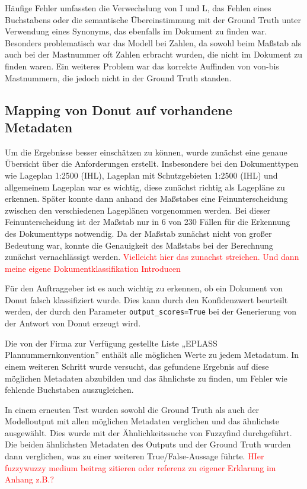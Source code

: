 \documentclass[12pt,a4paper,twoside]{article}
\newcommand\myworries[1]{\textcolor{red}{#1}}
\begin{document}
Häufige Fehler umfassten die Verwechslung von I und L, das Fehlen eines Buchstabens oder die semantische Übereinstimmung mit der Ground Truth unter Verwendung eines Synonyms, das ebenfalls im Dokument zu finden war. Besonders problematisch war das Modell bei Zahlen, da sowohl beim Maßstab als auch bei der Mastnummer oft Zahlen erbracht wurden, die nicht im Dokument zu finden waren. Ein weiteres Problem war das korrekte Auffinden von von-bis Mastnummern, die jedoch nicht in der Ground Truth standen.

\subsection{Mapping von Donut auf vorhandene Metadaten}

Um die Ergebnisse besser einschätzen zu können, wurde zunächst eine genaue Übersicht über die Anforderungen erstellt. Insbesondere bei den Dokumenttypen wie Lageplan 1:2500 (IHL), Lageplan mit Schutzgebieten 1:2500 (IHL) und allgemeinem Lageplan war es wichtig, diese zunächst richtig als Lagepläne zu erkennen. Später konnte dann anhand des Maßstabes eine Feinunterscheidung zwischen den verschiedenen Lageplänen vorgenommen werden. Bei dieser Feinunterscheidung ist der Maßstab nur in 6 von 230 Fällen für die Erkennung des Dokumenttyps notwendig. Da der Maßstab zunächst nicht von großer Bedeutung war, konnte die Genauigkeit des Maßstabs bei der Berechnung zunächst vernachlässigt werden. 
\myworries{Vielleicht hier das zunachst streichen. Und dann meine eigene Dokumentklassifikation Introducen}

Für den Auftraggeber ist es auch wichtig zu erkennen, ob ein Dokument von Donut falsch klassifiziert wurde. Dies kann durch den Konfidenzwert beurteilt werden, der durch den Parameter \texttt{output\_scores=True} bei der Generierung von der Antwort von Donut erzeugt wird.

Die von der Firma zur Verfügung gestellte Liste „EPLASS Plannummernkonvention” enthält alle möglichen Werte zu jedem Metadatum. In einem weiteren Schritt wurde versucht, das gefundene Ergebnis auf diese möglichen Metadaten abzubilden und das ähnlichste zu finden, um Fehler wie fehlende Buchstaben auszugleichen.

In einem erneuten Test wurden sowohl die Ground Truth als auch der Modelloutput mit allen möglichen Metadaten verglichen und das ähnlichste ausgewählt. Dies wurde mit der Ähnlichkeitssuche von Fuzzyfind \cite{Fuzzywuzzy} durchgeführt. Die beiden ähnlichsten Metadaten des Outputs und der Ground Truth wurden dann verglichen, was zu einer weiteren True/False-Aussage führte.
\myworries{HIer fuzzywuzzy medium beitrag zitieren oder referenz zu eigener Erklarung im Anhang z.B.?}
\end{document}
